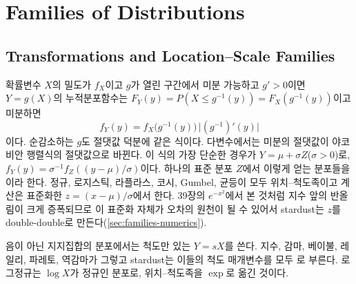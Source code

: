 \chapter{Families of Distributions}
\label{ch:distribution-families}


\section{Transformations and Location--Scale Families}
\label{sec:transformations}

확률변수 $X$의 밀도가 $f_X$이고 $g$가 열린 구간에서 미분 가능하고 $g'>0$이면 $Y=g(X)$의 누적분포함수는 $F_Y(y)=P(X\le g^{-1}(y))=F_X(g^{-1}(y))$이고 미분하면
\[
f_Y(y)=f_X\bigl(g^{-1}(y)\bigr)\,\bigl|(g^{-1})'(y)\bigr|
\]
이다. 순감소하는 $g$도 절댓값 덕분에 같은 식이다. 다변수에서는 미분의 절댓값이 야코비안 행렬식의 절댓값으로 바뀐다. 이 식의 가장 단순한 경우가 $Y=\mu+\sigma Z$($\sigma>0$)로, $f_Y(y)=\sigma^{-1}f_Z((y-\mu)/\sigma)$이다. 하나의 표준 분포 $Z$에서 이렇게 얻는 분포들을 이라 한다. 정규, 로지스틱, 라플라스, 코시, Gumbel, 균등이 모두 위치--척도족이고 계산은 표준화한 $z=(x-\mu)/\sigma$에서 한다. 39장의 $e^{-x^2}$에서 본 것처럼 지수 앞의 반올림이 크게 증폭되므로 이 표준화 자체가 오차의 원천이 될 수 있어서 stardust는 $z$를 double-double로 만든다(\cref{sec:families-numerics}).

음이 아닌 지지집합의 분포에서는 척도만 있는  $Y=sX$를 쓴다. 지수, 감마, 베이불, 레일리, 파레토, 역감마가 그렇고 stardust는 이들의 척도 매개변수를 모두 로 부른다. 로그정규는 $\log X$가 정규인 분포로, 위치--척도족을 $\exp$로 옮긴 것이다.

